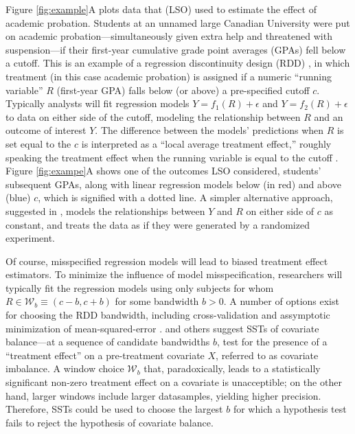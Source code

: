 \documentclass[12pt]{article}\usepackage[]{graphicx}\usepackage[]{color}
\begin{document}
Figure \ref{fig:example}A plots data that \citet*{lso} (LSO) used to estimate the effect of academic
probation.
Students at an unnamed large Canadian University were put on academic
probation---simultaneously given extra help and threatened with
suspension---if their first-year cumulative grade point averages
(GPAs) fell below a cutoff.
This is an example of a regression discontinuity design (RDD) \citep{thistlewhiteCampbell}, in
which treatment (in this case academic probation) is assigned if a
numeric ``running variable'' $R$ (first-year GPA) falls below (or above) a
pre-specified cutoff $c$.
Typically \citep[e.g.][]{imbensLemiuxRDD,angristLavy,lee} analysts
will fit regression models $Y=f_1(R)+\epsilon$ and $Y=f_2(R)+\epsilon$
to data on either side of the cutoff, modeling the relationship
between $R$ and an outcome of interest $Y$.
The difference between the models' predictions when $R$ is set equal
to the $c$ is interpreted as a ``local
average treatment effect,'' roughly speaking the treatment effect when
the running variable is equal to the cutoff \citep{HTV}.
Figure \ref{fig:exampe}A shows one of the outcomes LSO considered,
students' subsequent GPAs, along with linear regression models below
(in red) and above (blue) $c$, which is signified with a dotted
line.
A simpler alternative approach, suggested in \citet{cft}, models the
relationships between $Y$ and $R$ on either side of $c$ as constant,
and treats the data as if they were generated by a randomized
experiment.

Of course, misspecified regression models will lead to biased
treatment effect estimators.
To minimize the influence of model misspecification, researchers will
typically fit the regression models using only subjects for whom $R\in
\mathcal{W}_b\equiv (c-b,c+b)$ for some bandwidth $b>0$.
A number of options exist for choosing the RDD bandwidth, including
cross-validation \citep{ludwigMiller} and assymptotic minimization of
mean-squared-error \citep{IK}.
\citet{cft} and others \citet{salesHansen,angristWanna} suggest SSTs
of covariate balance---at a sequence of candidate bandwidths $b$, test
for the presence of a ``treatment effect'' on a pre-treatment
covariate $X$, referred to as covariate imbalance.
A window choice $\mathcal{W}_b$ that, paradoxically, leads to a
statistically significant
non-zero treatment effect on a covariate is unacceptible; on the other
hand, larger windows include larger datasamples, yielding higher
precision.
Therefore, SSTs could be used to choose the largest $b$ for which a
hypothesis test fails to reject the hypothesis of covariate balance.
\end{document}
